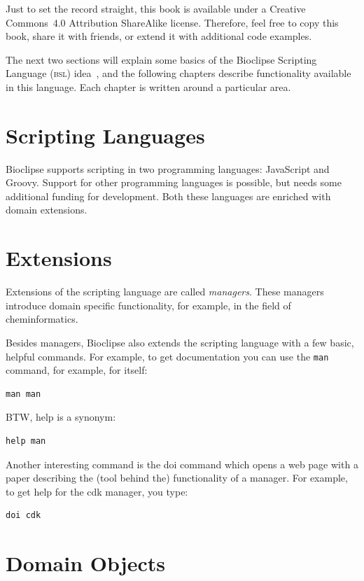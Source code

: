 \documentclass{book}
\begin{document}
\begin{refsection}

Just to set the record straight, this book is available under a
Creative Commons~4.0 Attribution ShareAlike license. Therefore,
feel free to copy this book, share it with friends, or extend it
with additional code examples.

The next two sections will explain some basics of the Bioclipse
Scripting Language (\textsc{bsl}) idea~\cite{spjuth2009bioclipse}, and the following chapters describe
functionality available in this language. Each chapter is written
around a particular area.

\section{Scripting Languages}

Bioclipse supports scripting in two programming languages:
JavaScript and Groovy.
Support for other programming languages
is possible, but needs some additional funding for development.
Both these languages are enriched with domain extensions.

\section{Extensions}

Extensions of the scripting language are called \emph{managers}.
These managers introduce domain specific functionality, for
example, in the field of cheminformatics.

Besides managers, Bioclipse also extends the scripting language with a few
basic, helpful commands. For example, to get documentation you can
use the \texttt{man} command, for example, for itself:
\begin{Verbatim}
man man
\end{Verbatim}
BTW, help is a synonym:
\begin{Verbatim}
help man
\end{Verbatim}

Another interesting command is the doi command which opens a web page
with a paper describing the (tool behind the) functionality of a manager.
For example, to get help for the cdk manager, you type:

\begin{Verbatim}
doi cdk
\end{Verbatim}

\section{Domain Objects}


\end{refsection}
\end{document}
